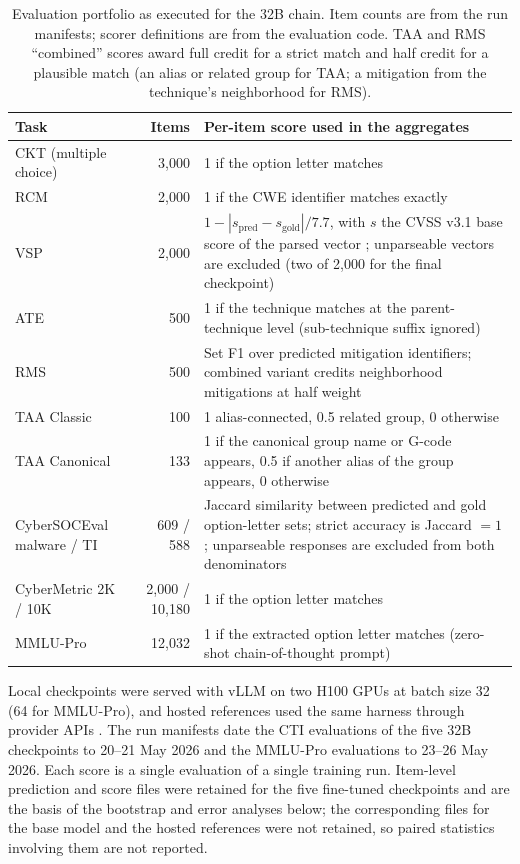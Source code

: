 \documentclass[twocolumn]{svjour3}
\begin{document}
\begin{table}
\centering\footnotesize
\caption{Evaluation portfolio as executed for the 32B chain. Item counts are from the run manifests; scorer definitions are from the evaluation code. TAA and RMS ``combined'' scores award full credit for a strict match and half credit for a plausible match (an alias or related group for TAA; a mitigation from the technique's neighborhood for RMS).}\label{tab:portfolio}
\begin{tabularx}{\textwidth}{@{}lrX@{}}
\toprule Task & Items & Per-item score used in the aggregates \\\midrule
CKT (multiple choice) & 3,000 & 1 if the option letter matches \\
RCM & 2,000 & 1 if the CWE identifier matches exactly \\
VSP & 2,000 & $1-|s_{\text{pred}}-s_{\text{gold}}|/7.7$, with $s$ the CVSS v3.1 base score of the parsed vector \cite{first2019cvss}; unparseable vectors are excluded (two of 2,000 for the final checkpoint) \\
ATE & 500 & 1 if the technique matches at the parent-technique level (sub-technique suffix ignored) \\
RMS & 500 & Set F1 over predicted mitigation identifiers; combined variant credits neighborhood mitigations at half weight \\
TAA Classic & 100 & 1 alias-connected, 0.5 related group, 0 otherwise \\
TAA Canonical & 133 & 1 if the canonical group name or G-code appears, 0.5 if another alias of the group appears, 0 otherwise \\
CyberSOCEval malware / TI & 609 / 588 & Jaccard similarity between predicted and gold option-letter sets; strict accuracy is Jaccard $=1$; unparseable responses are excluded from both denominators \\
CyberMetric 2K / 10K & 2,000 / 10,180 & 1 if the option letter matches \\
MMLU-Pro & 12,032 & 1 if the extracted option letter matches (zero-shot chain-of-thought prompt) \\\bottomrule
\end{tabularx}
\end{table}

Local checkpoints were served with vLLM \cite{kwon2023vllm} on two H100 GPUs at batch size 32 (64 for MMLU-Pro), and hosted references used the same harness through provider APIs \cite{glaukopis2026software}. The run manifests date the CTI evaluations of the five 32B checkpoints to 20--21 May 2026 and the MMLU-Pro evaluations to 23--26 May 2026. Each score is a single evaluation of a single training run. Item-level prediction and score files were retained for the five fine-tuned checkpoints and are the basis of the bootstrap and error analyses below; the corresponding files for the base model and the hosted references were not retained, so paired statistics involving them are not reported.
\end{document}
